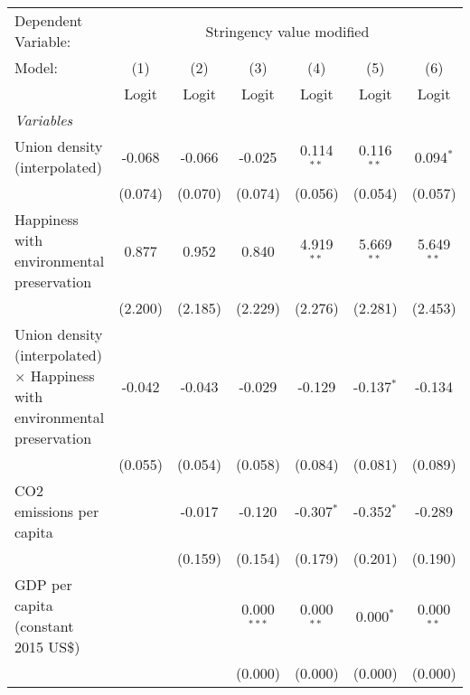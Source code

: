 
\begingroup
\centering
\begin{tabular}{lcccccc}
   \toprule
   Dependent Variable: & \multicolumn{6}{c}{Stringency value modified}\\
   Model:                                                                           & (1)     & (2)     & (3)           & (4)           & (5)          & (6)\\  
                                                                                    &  Logit  & Logit   & Logit         & Logit         & Logit        & Logit\\  
   \midrule
   \emph{Variables}\\
   Union density (interpolated)                                                     & -0.068  & -0.066  & -0.025        & 0.114$^{**}$  & 0.116$^{**}$ & 0.094$^{*}$\\   
                                                                                    & (0.074) & (0.070) & (0.074)       & (0.056)       & (0.054)      & (0.057)\\   
   Happiness with environmental preservation                                        & 0.877   & 0.952   & 0.840         & 4.919$^{**}$  & 5.669$^{**}$ & 5.649$^{**}$\\   
                                                                                    & (2.200) & (2.185) & (2.229)       & (2.276)       & (2.281)      & (2.453)\\   
   Union density (interpolated) $\times$ Happiness with environmental preservation  & -0.042  & -0.043  & -0.029        & -0.129        & -0.137$^{*}$ & -0.134\\   
                                                                                    & (0.055) & (0.054) & (0.058)       & (0.084)       & (0.081)      & (0.089)\\   
   CO2 emissions per capita                                                         &         & -0.017  & -0.120        & -0.307$^{*}$  & -0.352$^{*}$ & -0.289\\   
                                                                                    &         & (0.159) & (0.154)       & (0.179)       & (0.201)      & (0.190)\\   
   GDP per capita (constant 2015 US\$)                                              &         &         & 0.000$^{***}$ & 0.000$^{**}$  & 0.000$^{*}$  & 0.000$^{**}$\\   
                                                                                    &         &         & (0.000)       & (0.000)       & (0.000)      & (0.000)\\   

\end{tabular}
